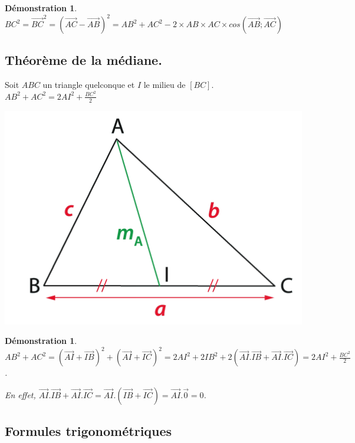 \documentclass[a4paper,11pt]{article}
\theoremstyle{break}
\newcounter{enonce}
\newtheorem{demonstration}[enonce]{Démonstration}
\begin{document}
\begin{demonstration}
 $BC^2=\vec{BC}^2=(\vec{AC}-\vec{AB})^2=AB^2+AC^2-2\times AB\times AC \times cos(\vec{AB};\vec{AC})$
\end{demonstration}


\subsection{Théorème de la médiane.}

\begin{theorem}
 Soit $ABC$ un triangle quelconque et $I$ le milieu de $[BC]$. $AB^2+AC^2=2AI^2+\frac{BC^2}{2}$
 
   \begin{center}
    \includegraphics[scale=0.5]{../Images/mediane.png}
  \end{center}
\end{theorem}

\begin{demonstration}
 $AB^2+AC^2=(\vec{AI}+\vec{IB})^2+(\vec{AI}+\vec{IC})^2=
 2AI^2+2IB^2+2(\vec{AI}.\vec{IB}+\vec{AI}.\vec{IC})=
 2AI^2+\frac{BC^2}{2}$. 
 
 En effet, $\vec{AI}.\vec{IB}+\vec{AI}.\vec{IC}=\vec{AI}.(\vec{IB}+\vec{IC})=\vec{AI}.\vec{0}=0$.
\end{demonstration}


\subsection{Formules trigonométriques}
\end{document}
